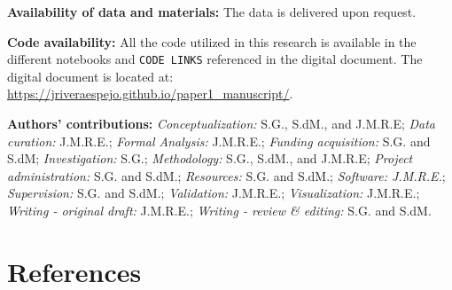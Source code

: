 \documentclass[
]{agujournal2019}
\begin{document}
\textbf{Availability of data and materials:} {The data is delivered upon
request.}

\textbf{Code availability:} {All the code utilized in this research is
available in the different notebooks and \texttt{CODE\ LINKS} referenced
in the digital document. The digital document is located at:}
\url{https://jriveraespejo.github.io/paper1_manuscript/}.

\textbf{Authors' contributions:} \emph{Conceptualization:} S.G., S.dM.,
and J.M.R.E; \emph{Data curation:} J.M.R.E.; \emph{Formal Analysis:}
J.M.R.E.; \emph{Funding acquisition:} S.G. and S.dM;
\emph{Investigation:} S.G.; \emph{Methodology:} S.G., S.dM., and
J.M.R.E; \emph{Project administration:} S.G. and S.dM.;
\emph{Resources:} S.G. and S.dM.; \emph{Software: J.M.R.E.};
\emph{Supervision:} S.G. and S.dM.; \emph{Validation:} J.M.R.E.;
\emph{Visualization:} J.M.R.E.; \emph{Writing - original draft:}
J.M.R.E.; \emph{Writing - review \& editing:} S.G. and S.dM.

\newpage{}

\section*{References}\label{references}
\end{document}

